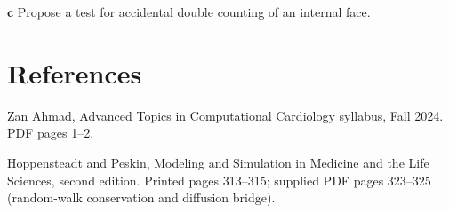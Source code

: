 \documentclass[11pt,letterpaper]{article}
\theoremstyle{definition}\newtheorem{definition}{Definition}\newtheorem{example}{Example}
\numberwithin{equation}{section}
\begin{document}
\textbf{c} Propose a test for accidental double counting of an internal face.

\section*{References}
\noindent\begin{minipage}{\linewidth}
Zan Ahmad, Advanced Topics in Computational Cardiology syllabus, Fall 2024. PDF pages 1--2.

\end{minipage}\par\medskip
\noindent\begin{minipage}{\linewidth}
Hoppensteadt and Peskin, Modeling and Simulation in Medicine and the Life Sciences, second edition. Printed pages 313--315; supplied PDF pages 323--325 (random-walk conservation and diffusion bridge).

\end{minipage}\par\medskip
\end{document}
